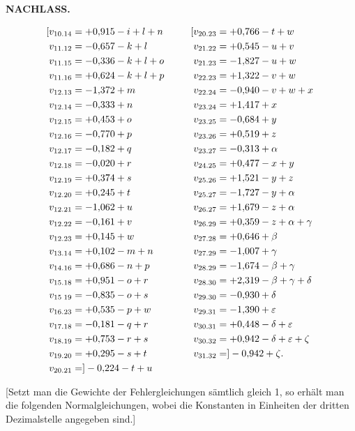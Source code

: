 \par\clearpage
\noindent{}\hfill{\small\textbf{NACHLASS.}}\hfill\null\par\medskip
\[
\begin{aligned}
\makebox[0pt][r]{[}v_{10.14}&=+0{,}915-i+l+n &\qquad \makebox[0pt][r]{[}v_{20.23}&=+0{,}766-t+w\\
v_{11.12}&=-0{,}657-k+l &\qquad v_{21.22}&=+0{,}545-u+v\\
v_{11.15}&=-0{,}336-k+l+o &\qquad v_{21.23}&=-1{,}827-u+w\\
v_{11.16}&=+0{,}624-k+l+p &\qquad v_{22.23}&=+1{,}322-v+w\\
v_{12.13}&=-1{,}372+m &\qquad v_{22.24}&=-0{,}940-v+w+x\\
v_{12.14}&=-0{,}333+n &\qquad v_{23.24}&=+1{,}417+x\\
v_{12.15}&=+0{,}453+o &\qquad v_{23.25}&=-0{,}684+y\\
v_{12.16}&=-0{,}770+p &\qquad v_{23.26}&=+0{,}519+z\\
v_{12.17}&=-0{,}182+q &\qquad v_{23.27}&=-0{,}313+\alpha\\
v_{12.18}&=-0{,}020+r &\qquad v_{24.25}&=+0{,}477-x+y\\
v_{12.19}&=+0{,}374+s &\qquad v_{25.26}&=+1{,}521-y+z\\
v_{12.20}&=+0{,}245+t &\qquad v_{25.27}&=-1{,}727-y+\alpha\\
v_{12.21}&=-1{,}062+u &\qquad v_{26.27}&=+1{,}679-z+\alpha\\
v_{12.22}&=-0{,}161+v &\qquad v_{26.29}&=+0{,}359-z+\alpha+\gamma\\
v_{12.23}&=+0{,}145+w &\qquad v_{27.28}&=+0{,}646+\beta\\
v_{13.14}&=+0{,}102-m+n &\qquad v_{27.29}&=-1{,}007+\gamma\\
v_{14.16}&=+0{,}686-n+p &\qquad v_{28.29}&=-1{,}674-\beta+\gamma\\
v_{15.18}&=+0{,}951-o+r &\qquad v_{28.30}&=+2{,}319-\beta+\gamma+\delta\\
v_{15\;19}&=-0{,}835-o+s &\qquad v_{29.30}&=-0{,}930+\delta\\
v_{16.23}&=+0{,}535-p+w &\qquad v_{29.31}&=-1{,}390+\varepsilon\\
v_{17.18}&=-0{,}181-q+r &\qquad v_{30.31}&=+0{,}448-\delta+\varepsilon\\
v_{18.19}&=+0{,}753-r+s &\qquad v_{30.32}&=+0{,}942-\delta+\varepsilon+\zeta\\
v_{19.20}&=+0{,}295-s+t &\qquad v_{31.32}&=]-0{,}942+\zeta.\\
v_{20.21}&=]-0{,}224-t+u &\qquad &\\
\end{aligned}
\]
\par\medskip
\par\noindent\hspace*{\parindent}[Setzt man die Gewichte der Fehlergleichungen sämtlich
gleich 1, so erhält man die folgenden Normalgleichungen, wobei
die Konstanten in Einheiten der dritten Dezimalstelle angegeben sind.]

